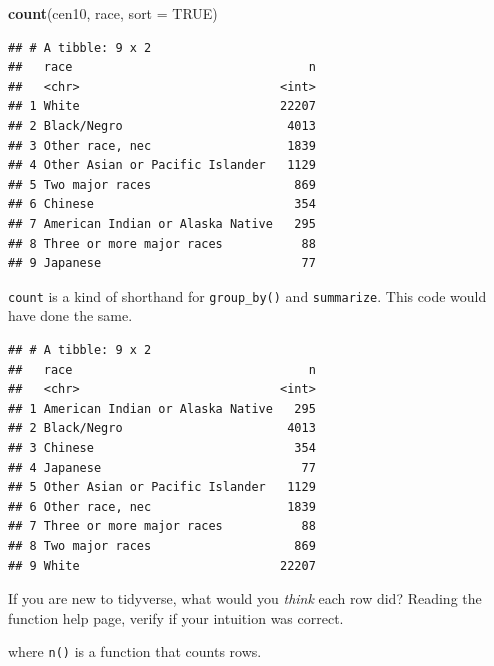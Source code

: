 \documentclass[]{book}
\newenvironment{Shaded}{\begin{snugshade}}{\end{snugshade}}
\newcommand{\DataTypeTok}[1]{\textcolor[rgb]{0.13,0.29,0.53}{#1}}
\newcommand{\KeywordTok}[1]{\textcolor[rgb]{0.13,0.29,0.53}{\textbf{#1}}}
\newcommand{\NormalTok}[1]{#1}
\newcommand{\OperatorTok}[1]{\textcolor[rgb]{0.81,0.36,0.00}{\textbf{#1}}}
\newcommand{\OtherTok}[1]{\textcolor[rgb]{0.56,0.35,0.01}{#1}}
\newcommand{\StringTok}[1]{\textcolor[rgb]{0.31,0.60,0.02}{#1}}
\theoremstyle{definition}
\theoremstyle{definition}
\theoremstyle{definition}
\theoremstyle{remark}
\begin{document}
\begin{Shaded}
\begin{Highlighting}[]
\begin{Shaded}
\begin{Highlighting}[]
\begin{Shaded}
\begin{Highlighting}[]
\KeywordTok{count}\NormalTok{(cen10, race, }\DataTypeTok{sort =} \OtherTok{TRUE}\NormalTok{)}
\end{Highlighting}
\end{Shaded}

\begin{verbatim}
## # A tibble: 9 x 2
##   race                                 n
##   <chr>                            <int>
## 1 White                            22207
## 2 Black/Negro                       4013
## 3 Other race, nec                   1839
## 4 Other Asian or Pacific Islander   1129
## 5 Two major races                    869
## 6 Chinese                            354
## 7 American Indian or Alaska Native   295
## 8 Three or more major races           88
## 9 Japanese                            77
\end{verbatim}

\texttt{count} is a kind of shorthand for \texttt{group\_by()} and \texttt{summarize}. This code would have done the same.

\begin{Shaded}
\end{Shaded}

\begin{verbatim}
## # A tibble: 9 x 2
##   race                                 n
##   <chr>                            <int>
## 1 American Indian or Alaska Native   295
## 2 Black/Negro                       4013
## 3 Chinese                            354
## 4 Japanese                            77
## 5 Other Asian or Pacific Islander   1129
## 6 Other race, nec                   1839
## 7 Three or more major races           88
## 8 Two major races                    869
## 9 White                            22207
\end{verbatim}

If you are new to tidyverse, what would you \emph{think} each row did? Reading the function help page, verify if your intuition was correct.

where \texttt{n()} is a function that counts rows.


\end{Highlighting}
\end{Shaded}
\end{Highlighting}
\end{Shaded}
\end{document}

